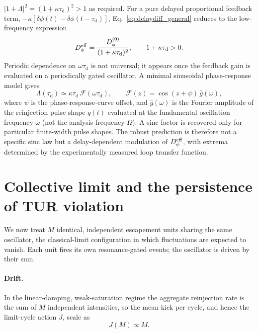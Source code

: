\documentclass[aps,pre,reprint,amsmath,amssymb,floatfix,nofootinbib]{revtex4-2}
\newcommand{\Dphi}{D_{\phi}}
\newcommand{\taud}{\tau_{\mathrm{d}}}
\begin{document}
$|1+\Lambda|^2=(1+\kappa\taud)^2>1$ as required.
For a pure delayed proportional feedback term,
$-\kappa[\delta\phi(t)-\delta\phi(t-\taud)]$, Eq.~\eqref{eq:delaydiff_general}
reduces to the low-frequency expression
\begin{equation}
  \Dphi^{\rm eff}
  =
  \frac{\Dphi^{(0)}}{(1+\kappa\taud)^2},
  \qquad 1+\kappa\taud>0 .
  \label{eq:pure_delay_diffusion}
\end{equation}
Periodic dependence on $\omega\taud$ is not universal; it appears once
the feedback gain is evaluated on a periodically gated oscillator. A
minimal sinusoidal phase-response model gives
\begin{equation}
  \Lambda(\taud)
  \simeq
  \kappa\taud\,\mathcal{F}(\omega\taud),
  \qquad
  \mathcal{F}(z)=\cos(z+\psi)\,\widehat g(\omega),
  \label{eq:delaydiff_sinusoidal}
\end{equation}
where $\psi$ is the phase-response-curve offset, and $\widehat g(\omega)$
is the Fourier amplitude of the reinjection pulse shape $q(t)$ evaluated
at the fundamental oscillation frequency $\omega$ (not the analysis
frequency $\Omega$). A sinc factor is recovered only for particular
finite-width pulse shapes. The robust prediction is therefore not a
specific sinc law but a delay-dependent modulation of $\Dphi^{\rm eff}$,
with extrema determined by the experimentally measured loop transfer
function.

\section{Collective limit and the persistence of TUR violation}
\label{sec:collective}

We now treat $M$ identical, independent escapement units sharing the same
oscillator, the classical-limit configuration in which fluctuations are
expected to vanish. Each unit fires its own resonance-gated events; the
oscillator is driven by their sum.

\paragraph*{Drift.}
In the linear-damping, weak-saturation regime the aggregate reinjection
rate is the sum of $M$ independent intensities, so the mean kick per
cycle, and hence the limit-cycle action $J$, scale as
\begin{equation}
  J(M) \propto M .
  \label{eq:action}
\end{equation}
\end{document}

